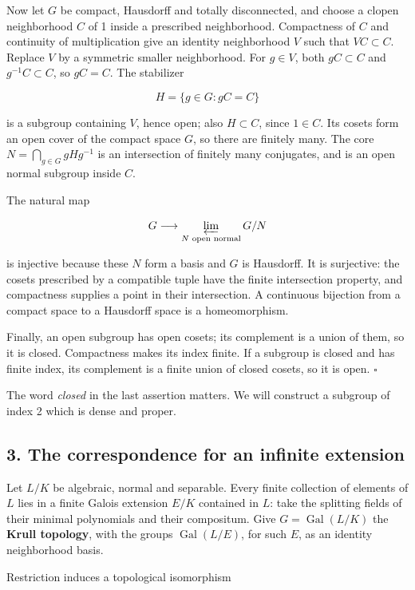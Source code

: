 \documentclass[11pt,a4paper]{article}
\begin{document}
Now let \(G\) be compact, Hausdorff and totally disconnected, and choose
a clopen neighborhood \(C\) of 1 inside a prescribed neighborhood.
Compactness of \(C\) and continuity of multiplication give an identity
neighborhood \(V\) such that \(VC\subset C\). Replace \(V\) by a
symmetric smaller neighborhood. For \(g\in V\), both \(gC\subset C\) and
\(g^{-1}C\subset C\), so \(gC=C\). The stabilizer

\[
H=\{g\in G:gC=C\}
\]

is a subgroup containing \(V\), hence open; also \(H\subset C\), since
\(1\in C\). Its cosets form an open cover of the compact space \(G\), so
there are finitely many. The core \(N=\bigcap_{g\in G}gHg^{-1}\) is an
intersection of finitely many conjugates, and is an open normal subgroup
inside \(C\).

The natural map

\[
G\longrightarrow\varprojlim_{N\text{ open normal}}G/N
\]

is injective because these \(N\) form a basis and \(G\) is Hausdorff. It
is surjective: the cosets prescribed by a compatible tuple have the
finite intersection property, and compactness supplies a point in their
intersection. A continuous bijection from a compact space to a Hausdorff
space is a homeomorphism.

Finally, an open subgroup has open cosets; its complement is a union of
them, so it is closed. Compactness makes its index finite. If a subgroup
is closed and has finite index, its complement is a finite union of
closed cosets, so it is open. \(\square\)

The word \emph{closed} in the last assertion matters. We will construct
a subgroup of index 2 which is dense and proper.

\subsection{3. The correspondence for an infinite
extension}\label{the-correspondence-for-an-infinite-extension}

Let \(L/K\) be algebraic, normal and separable. Every finite collection
of elements of \(L\) lies in a finite Galois extension \(E/K\) contained
in \(L\): take the splitting fields of their minimal polynomials and
their compositum. Give \(G=\operatorname{Gal}(L/K)\) the \textbf{Krull
topology}, with the groups \(\operatorname{Gal}(L/E)\), for such \(E\),
as an identity neighborhood basis.

Restriction induces a topological isomorphism
\end{document}
